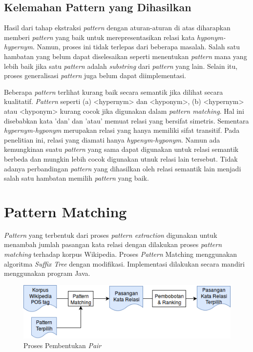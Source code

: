 \subsection{Kelemahan Pattern yang Dihasilkan}
Hasil dari tahap ekstraksi \textit{pattern} dengan aturan-aturan di atas diharapkan memberi \textit{pattern} yang baik untuk merepresentasikan relasi kata \textit{hyponym-hypernym}. Namun, proses ini tidak terlepas dari beberapa masalah. Salah satu hambatan yang belum dapat diselesaikan seperti menentukan \textit{pattern} mana yang lebih baik jika satu \textit{pattern} adalah \textit{substring} dari \textit{pattern} yang lain. Selain itu, proses generalisasi \textit{pattern} juga belum dapat diimplementasi. 

Beberapa \textit{pattern} terlihat kurang baik secara semantik jika dilihat secara kualitatif. \textit{Pattern} seperti (a) <hypernym> dan <hyponym>, (b) <hypernym> atau <hyponym> kurang cocok jika digunakan dalam \textit{pattern matching}. Hal ini disebabkan kata 'dan' dan 'atau' memuat relasi yang bersifat simetris. Sementara \textit{hypernym-hyponym} merupakan relasi yang hanya memiliki sifat transitif. Pada penelitian ini, relasi yang diamati hanya \textit{hypenym-hyponym}. Namun ada kemungkinan suatu \textit{pattern} yang sama dapat digunakan untuk relasi semantik berbeda dan mungkin lebih cocok digunakan utnuk relasi lain tersebut. Tidak adanya perbandingan \textit{pattern} yang dihasilkan oleh relasi semantik lain menjadi salah satu hambatan memilih \textit{pattern} yang baik.


\section{Pattern Matching}
\textit{Pattern} yang terbentuk dari proses \textit{pattern extraction} digunakan untuk menambah jumlah pasangan kata relasi dengan dilakukan proses \textit{pattern matching} terhadap korpus Wikipedia. Proses \textit{Pattern} Matching menggunakan algoritma \textit{Suffix Tree} dengan modifikasi. Implementasi dilakukan secara mandiri menggunakan program Java.

\begin{figure}
    \centering
    \includegraphics[scale=0.6]{pics/Pic04-PatternMatching}
    \caption{Proses Pembentukan \textit{Pair}}
    \label{fig:pattern-matching}
\end{figure}

